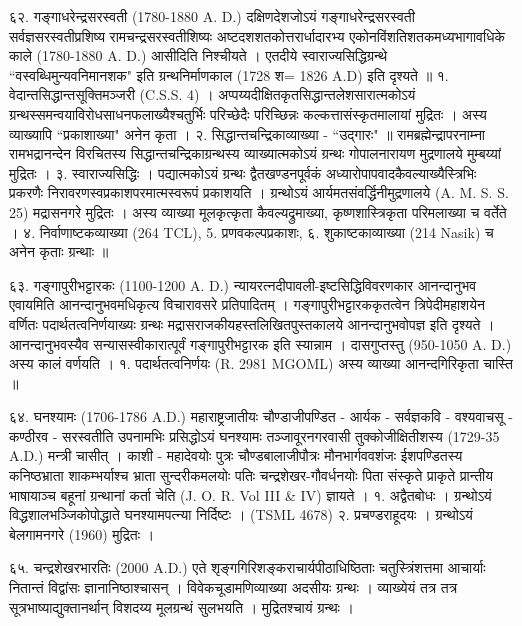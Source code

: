 ६२. गङ्गाधरेन्द्रसरस्वती (1780-1880 A. D.)
दक्षिणदेशजोऽयं गङ्गाधरेन्द्रसरस्वती सर्वज्ञसरस्वतीप्रशिष्य रामचन्द्रसरस्वतीशिष्यः अष्टदशशतकोत्तरार्धादारभ्य एकोनविंशतिशतकमध्यभागावधिके काले (1780-1880 A. D.) आसीदिति निश्चीयते । एतदीये स्वाराज्यसिद्धिग्रन्थे ``वस्वब्धिमुन्यवनिमानशक" इति ग्रन्थनिर्माणकाल (1728 श= 1826 A.D) इति दृश्यते ॥
१. वेदान्तसिद्धान्तसूक्तिमञ्जरी (C.S.S. 4) । अप्पय्यदीक्षितकृतसिद्धान्तलेशसारात्मकोऽयं ग्रन्थस्समन्वयाविरोधसाधनफलाख्यैश्चतुर्भिः परिच्छेदैः परिच्छिन्नः कल्कत्तासंस्कृतमालायां मुद्रितः । अस्य व्याख्यापि ``प्रकाशाख्या" अनेन कृता ।
२. सिद्धान्तचन्द्रिकाव्याख्या - ``उद्गारः" ॥ रामब्रह्मेन्द्रापरनाम्ना रामभद्रानन्देन विरचितस्य सिद्धान्तचन्द्रिकाग्रन्थस्य व्याख्यात्मकोऽयं ग्रन्थः गोपालनारायण मुद्रणालये मुम्बय्यां मुद्रितः ।
३. स्वाराज्यसिद्धिः । पद्यात्मकोऽयं ग्रन्थः द्वैतखण्डनपूर्वकं अध्यारोपापवादकैवल्याख्यैस्त्रिभिः प्रकरणैः निरावरणस्वप्रकाशपरमात्मस्वरूपं प्रकाशयति । ग्रन्थोऽयं आर्यमतसंवर्द्धिनीमुद्रणालये (A. M. S. S. 25) मद्रासनगरे मुद्रितः । अस्य व्याख्या मूलकृत्कृता कैवल्यद्रुमाख्या, कृष्णशास्त्रिकृता परिमलाख्या च वर्तेते ।
४. निर्वाणाष्टकव्याख्या (264 TCL), 5. प्रणवकल्पप्रकाशः,
६. शुकाष्टकाव्याख्या (214 Nasik) च अनेन कृताः ग्रन्थाः ॥

६३. गङ्गापुरीभट्टारकः (1100-1200 A. D.)
न्यायरत्नदीपावली-इष्टसिद्धिविवरणकार आनन्दानुभव एवायमिति आनन्दानुभवमधिकृत्य विचारावसरे प्रतिपादितम् । गङ्गापुरीभट्टारककृतत्वेन त्रिपेदीमहाशयेन वर्णितः पदार्थतत्वनिर्णयाख्यः ग्रन्थः मद्रासराजकीयहस्तलिखितपुस्तकालये आनन्दानुभवोपज्ञ इति दृश्यते । आनन्दानुभवस्यैव सन्यासस्वीकारात्पूर्वं गङ्गापुरीभट्टारक इति स्यान्नाम । दासगुप्तस्तु (950-1050 A. D.) अस्य कालं वर्णयति ।
१. पदार्थतत्वनिर्णयः (R. 2981 MGOML) अस्य व्याख्या आनन्दगिरिकृता चास्ति ॥

६४. घनश्यामः (1706-1786 A.D.)
महाराष्ट्रजातीयः चौण्डाजीपण्डित - आर्यक - सर्वज्ञकवि - वश्यवाचसू - कण्ठीरव - सरस्वतीति उपनामभिः प्रसिद्धोऽयं घनश्यामः तञ्जावूरनगरवासी तुक्कोजीक्षितीशस्य (1729-35 A.D.) मन्त्री चासीत् । काशी - महादेवयोः पुत्रः चौण्डबालाजीपौत्रः मौनभार्गववशंजः ईशपण्डितस्य कनिष्ठभ्राता शाकम्भर्याश्च भ्राता सुन्दरीकमलयोः पतिः चन्द्रशेखर-गौवर्धनयोः पिता संस्कृते प्राकृते प्रान्तीय भाषायाञ्च बहूनां ग्रन्थानां कर्ता चेति (J. O. R. Vol III & IV) ज्ञायते ।
१. अद्वैतबोधः । ग्रन्थोऽयं विद्धशालभञ्जिकोपोद्धाते घनश्यामपत्न्या निर्दिष्टः । (TSML 4678)
२. प्रचण्डराहूदयः । ग्रन्थोऽयं बेलगामनगरे (1960) मुद्रितः ।

६५. चन्द्रशेखरभारतिः (2000 A.D.)
एते शृङ्गगिरिशङ्कराचार्यपीठाधिष्ठिताः चतुस्त्रिंशत्तमा आचार्याः नितान्तं विद्वांसः ज्ञानानिष्ठाश्चासन् । विवेकचूडामणिव्याख्या अदसीयः ग्रन्थः । व्याख्येयं तत्र तत्र सूत्रभाष्याद्युक्तानर्थान् विशदय्य मूलग्रन्थं सुलभयति । मुद्रितश्चायं ग्रन्थः ।

